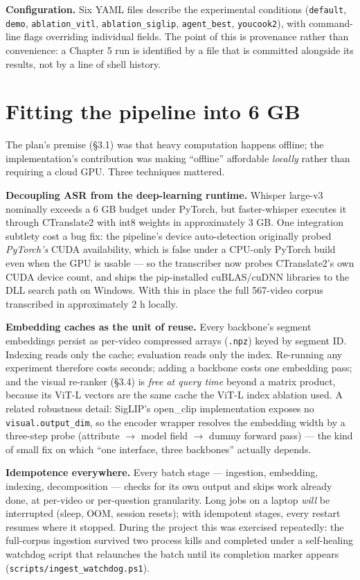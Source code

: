 \textbf{Configuration.} Six YAML files describe the experimental
conditions (\texttt{default}, \texttt{demo}, \texttt{ablation\_vitl},
\texttt{ablation\_siglip}, \texttt{agent\_best}, \texttt{youcook2}),
with command-line flags overriding individual fields. The point of this
is provenance rather than convenience: a Chapter 5 run is identified by
a file that is committed alongside its results, not by a line of shell
history.

\section{Fitting the pipeline into 6
GB}

The plan's premise (§3.1) was that heavy computation happens offline;
the implementation's contribution was making ``offline'' affordable
\emph{locally} rather than requiring a cloud GPU. Three techniques
mattered.

\textbf{Decoupling ASR from the deep-learning runtime.} Whisper large-v3
nominally exceeds a 6 GB budget under PyTorch, but faster-whisper
executes it through CTranslate2 with int8 weights in approximately 3 GB.
One integration subtlety cost a bug fix: the pipeline's device
auto-detection originally probed \emph{PyTorch's} CUDA availability,
which is false under a CPU-only PyTorch build even when the GPU is
usable --- so the transcriber now probes CTranslate2's own CUDA device
count, and ships the pip-installed cuBLAS/cuDNN libraries to the DLL
search path on Windows. With this in place the full 567-video corpus
transcribed in approximately 2 h locally.

\textbf{Embedding caches as the unit of reuse.} Every backbone's segment
embeddings persist as per-video compressed arrays (\texttt{.npz}) keyed
by segment ID. Indexing reads only the cache; evaluation reads only the
index. Re-running any experiment therefore costs seconds; adding a
backbone costs one embedding pass; and the visual re-ranker (§3.4) is
\emph{free at query time} beyond a matrix product, because its ViT-L
vectors are the same cache the ViT-L index ablation used. A related
robustness detail: SigLIP's open\_clip implementation exposes no
\texttt{visual.output\_dim}, so the encoder wrapper resolves the
embedding width by a three-step probe (attribute
\ensuremath{\rightarrow} model field \ensuremath{\rightarrow} dummy
forward pass) --- the kind of small fix on which ``one interface, three
backbones'' actually depends.

\textbf{Idempotence everywhere.} Every batch stage --- ingestion,
embedding, indexing, decomposition --- checks for its own output and
skips work already done, at per-video or per-question granularity. Long
jobs on a laptop \emph{will} be interrupted (sleep, OOM, session
resets); with idempotent stages, every restart resumes where it stopped.
During the project this was exercised repeatedly: the full-corpus
ingestion survived two process kills and completed under a self-healing
watchdog script that relaunches the batch until its completion marker
appears (\texttt{scripts/ingest\_watchdog.ps1}).

